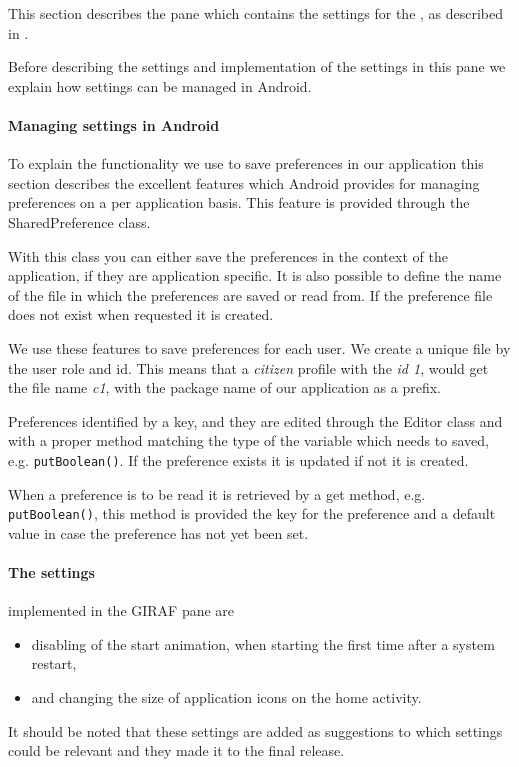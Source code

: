 This section describes the pane which contains the settings for the \launcher, as described in .

Before describing the settings and implementation of the settings in this pane we explain how settings can be managed in Android.

\paragraph{Managing settings in Android}
To explain the functionality we use to save preferences in our application this section describes the excellent features which Android provides for managing preferences on a per application basis. This feature is provided through the SharedPreference class.

With this class you can either save the preferences in the context of the application, if they are application specific. It is also possible to define the name of the file in which the preferences are saved or read from. If the preference file does not exist when requested it is created.

We use these features to save preferences for each user. We create a unique file by the user role and id.
This means that a \textit{citizen} profile with the \textit{id 1}, would get the file name \textit{c1}, with the package name of our application as a prefix.

Preferences identified by a key, and they are edited through the Editor class and with a proper method matching the type of the variable which needs to saved, e.g. \lstinline!putBoolean()!.
If the preference exists it is updated if not it is created.

When a preference is to be read it is retrieved by a get method, e.g. \lstinline!putBoolean()!, this method is provided the key for the preference and a default value in case the preference has not yet been set.

\paragraph{The settings} implemented in the GIRAF pane are
\begin{itemize}
 	\item disabling of the start animation, when starting \launcher the first time after a system restart,
 	\item and changing the size of application icons on the home activity.
 \end{itemize} 
It should be noted that these settings are added as suggestions to which settings could be relevant and they made it to the final release.

